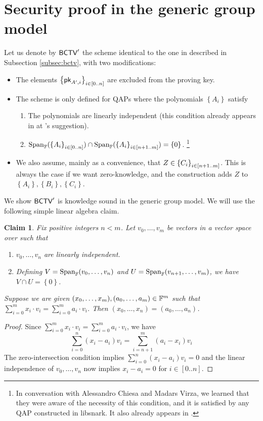 \documentclass[11pt]{article}
\numberwithin{figure}{section} %
\newtheorem{claim}[thm]{Claim}
\newcommand{\set}[1]{\ensuremath{\left\{#1\right\}}\xspace}
\begin{document}
 \renewcommand{\span}[1]{\ensuremath{\mathrm{Span}_{\F}(#1)}\xspace}
 \newcommand{\bctvprime}{\ensuremath{\bctv'}\xspace}
\section{Security proof in the generic group model}\label{sec:ggmproof}
Let us denote by \bctvprime the scheme identical to the one in \cite{BCTV} described in Subsection \ref{subsec:bctv},
with two modifications:
\begin{itemize}
 \item The elements $\sett{\pk_{A',i}}{i\in [0..n]}$ are excluded from the proving key.
 \item The scheme is only defined for QAPs where the polynomials \set{A_i} satisfy
   \begin{enumerate}
    \item The polynomials  are linearly independent (this condition already appears in \cite{BCTV} at \cite{Parno15}'s suggestion).
    \item $\span{\sett{A_i}{i\in[0..n]}}\cap \span{\sett{A_i}{i\in [n+1..m]}}=\set{0}$. \footnote{In conversation with Alessandro Chiesa and Madars Virza, we  learned that they were aware of the necessity of this condition, and it is satisfied by any QAP constructed in libsnark\cite{libsnark}. It also already appears in \cite{BGG}.}
   \end{enumerate}
 \item We also assume, mainly as a convenience, that $Z\in \sett{C_i}{i\in [n+1..m]}$. This is always the case if we want zero-knowledge, and the \bctv construction adds $Z$ to $\set{A_i},\set{B_i},\set{C_i}$.
\end{itemize}

We show \bctvprime is knowledge sound in the generic group model.
We will use the following simple linear algebra claim.
\begin{claim}\label{clm:independence}
 Fix positive integers $n<m$. Let $v_0,\ldots,v_m$ be vectors in a vector space over \F such that
 \begin{enumerate}
  \item $v_0,\ldots,v_n$ are linearly independent.
  \item Defining $V = \span{v_0,\ldots,v_n}$ and $U=\span{v_{n+1},\ldots,v_m}$, we have $V\cap U =\set{0}$.
 \end{enumerate}
Suppose we are given $(x_0,\ldots,x_m),(a_0,\ldots,a_m)\in \mathbb F^m$ such that $\sum_{i=0}^m x_i\cdot v_i = \sum_{i=0}^m a_i\cdot v_i$.
Then $(x_0,\ldots,x_n) = (a_0,\ldots,a_n)$.
\end{claim}
\begin{proof}
 Since $\sum_{i=0}^m x_i\cdot v_i = \sum_{i=0}^m a_i\cdot v_i$,
 we have
 \[\sum_{i=0}^n (x_i-a_i) v_i = \sum_{i=n+1}^m (a_i-x_i)v_i\]
 The zero-intersection condition implies $\sum_{i=0}^n (x_i-a_i) v_i=0 $
 and the linear independence of $v_0,\ldots,v_n$ now implies
 $x_i-a_i=0$ for $i\in [0..n]$.
 
\end{proof}
\end{document}
